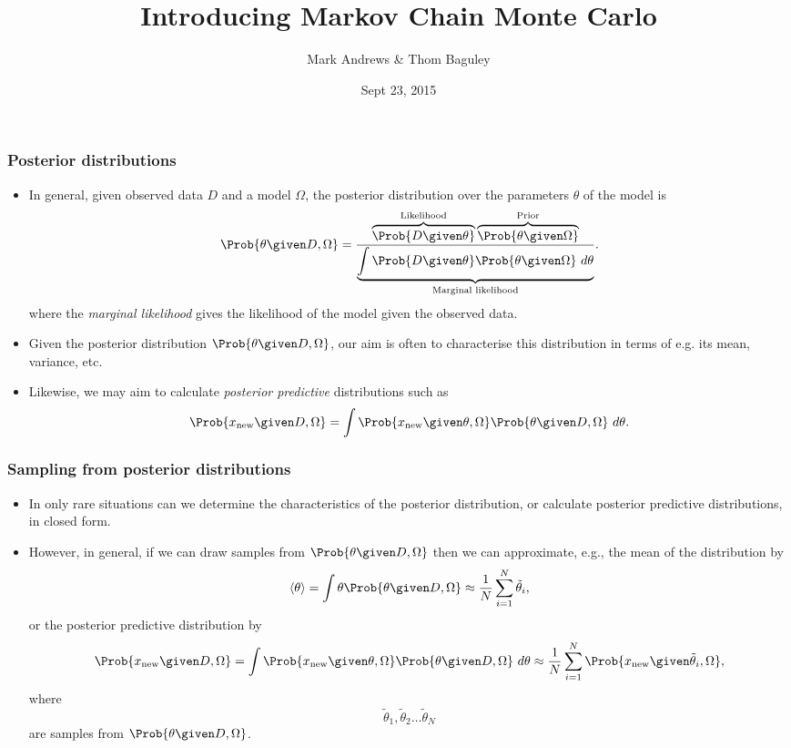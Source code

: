 \documentclass{slides}
\title[MCMC]{Introducing Markov Chain Monte Carlo}
\author[Andrews]{Mark Andrews \& Thom Baguley}
\date{Sept 23, 2015}
\begin{document}
{
	\begin{frame}
		\titlepage
	\end{frame}
}


\begin{frame}
	\frametitle{Posterior distributions}
	\begin{itemize}

		\item In general, given observed data $D$ and a model $\Omega$, the posterior distribution over the parameters $\theta$ of the model is
		\[
			\Prob{\theta\given D, \Omega}
			= \frac{\overbrace{\Prob{D\given\theta}}^{\text{Likelihood}}\overbrace{\Prob{\theta\given\Omega}}^{\text{Prior}}}
			{\underbrace{\int\Prob{D\given\theta}\Prob{\theta\given\Omega}\ d\theta}_{\text{Marginal likelihood}}}.
		\]
		where the \emph{marginal likelihood} gives the likelihood of the model given the observed data.

	\item Given the posterior distribution $\Prob{\theta\given D, \Omega}$, our aim is often to characterise this distribution in terms of e.g. its mean, variance, etc. 
	\item Likewise, we may aim to calculate \emph{posterior predictive} distributions such as 
		\[
			\Prob{x_{\text{new}} \given D, \Omega} = \int\Prob{x_{\text{new}}\given\theta,\Omega}\Prob{\theta\given D, \Omega}\ d\theta.
		\]

	\end{itemize}
\end{frame}

\begin{frame}
	\frametitle{Sampling from posterior distributions}
	\begin{itemize}

		\item In only rare situations can we determine the characteristics of the posterior distribution, or calculate posterior predictive distributions, in closed form.
		\item However, in general, if we can draw samples from $\Prob{\theta\given D, \Omega}$ then we can approximate, e.g., the mean of the distribution by
			\[
				\langle\theta\rangle = \int\theta\Prob{\theta\given D, \Omega} \approx \frac{1}{N} \sum_{i=1}^N \tilde{\theta}_i,
			\]
		or the posterior predictive distribution by 
		\[
			\Prob{x_{\text{new}} \given D, \Omega} = \int\Prob{x_{\text{new}}\given\theta,\Omega}\Prob{\theta\given D, \Omega}\ d\theta
			\approx \frac{1}{N} \sum_{i=1}^N \Prob{x_{\text{new}}\given\tilde{\theta}_i,\Omega},
		\]
		where \[\tilde{\theta}_1, \tilde{\theta}_2 \ldots \tilde{\theta}_N\] are samples from $\Prob{\theta\given D, \Omega}$.
	\end{itemize}
\end{frame}
\end{document}
